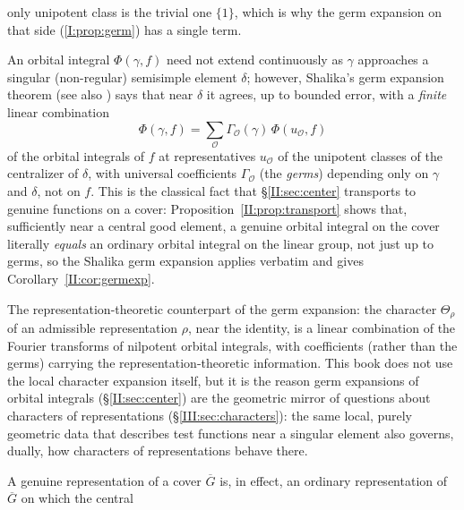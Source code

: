 \begin{description}
only unipotent class is the trivial one $\{1\}$, which is why the
germ expansion on that side (\cref{I:prop:germ}) has a single term.
\item[Shalika germ, germ expansion] An orbital integral
$\Phi(\gamma,f)$ need not extend continuously as $\gamma$ approaches
a singular (non-regular) semisimple element $\delta$; however,
Shalika's germ expansion theorem \cite{Sha72} (see also
\cite{HC70}) says that near $\delta$ it agrees, up to bounded error,
with a \emph{finite} linear combination
\[ \Phi(\gamma,f)=\sum_{\mathcal O}\Gamma_{\mathcal O}(\gamma)\,\Phi(u_{\mathcal O},f) \]
of the orbital integrals of $f$ at representatives $u_{\mathcal O}$
of the unipotent classes of the centralizer of $\delta$, with
universal coefficients $\Gamma_{\mathcal O}$ (the \emph{germs})
depending only on $\gamma$ and $\delta$, not on $f$. This is the
classical fact that \S\ref{II:sec:center} transports to genuine
functions on a cover: Proposition~\ref{II:prop:transport} shows that,
sufficiently near a central good element, a genuine orbital integral
on the cover literally \emph{equals} an ordinary orbital integral on
the linear group, not just up to germs, so the Shalika germ
expansion applies verbatim and gives Corollary~\ref{II:cor:germexp}.
\item[Harish-Chandra's local character expansion] The
representation-theoretic counterpart of the germ expansion: the
character $\Theta_\rho$ of an admissible representation $\rho$, near
the identity, is a linear combination of the Fourier transforms of
nilpotent orbital integrals, with coefficients (rather than the
germs) carrying the representation-theoretic information. This book
does not use the local character expansion itself, but it is the
reason germ expansions of orbital integrals (\S\ref{II:sec:center})
are the geometric mirror of questions about characters of
representations (\S\ref{III:sec:characters}): the same local, purely
geometric data that describes test functions near a singular element
also governs, dually, how characters of representations behave
there.
\item[Genuine representations as a parallel representation theory]
A genuine representation of a cover $\overline G$ is, in effect, an
ordinary representation of $\overline G$ on which the central

\end{description}
